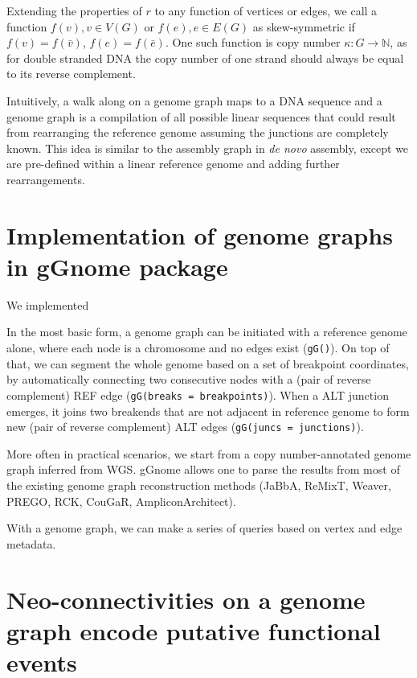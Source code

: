\documentclass[phd,tocprelim]{cornell}
\begin{document}
Extending the properties of $r$ to any function of vertices or edges, we call a function $f(v), v \in V(G)$ or $f(e), e \in E(G)$ as skew-symmetric if $f(v) = f(\bar{v})$, $f(e)=f(\bar{e})$. One such function is copy number $\kappa : G \rightarrow \mathbb{N}$, as for double stranded DNA the copy number of one strand should always be equal to its reverse complement.

Intuitively, a walk along on a genome graph maps to a DNA sequence and a genome graph is a compilation of all possible linear sequences that could result from rearranging the reference genome assuming the junctions are completely known. This idea is similar to the assembly graph in \textit{de novo} assembly, except we are pre-defined within a linear reference genome and adding further rearrangements.

\section{Implementation of genome graphs in gGnome package}
We implemented 

In the most basic form, a genome graph can be initiated with a reference genome alone, where each node is a chromosome and no edges exist (\texttt{gG()}). On top of that, we can segment the whole genome based on a set of breakpoint coordinates, by automatically connecting two consecutive nodes with a (pair of reverse complement) REF edge (\texttt{gG(breaks = breakpoints)}). When a ALT junction emerges, it joins two breakends that are not adjacent in reference genome to form new (pair of reverse complement) ALT edges (\texttt{gG(juncs = junctions)}).

More often in practical scenarios, we start from a copy number-annotated genome graph inferred from WGS. gGnome allows one to parse the results from most of the existing genome graph reconstruction methods (JaBbA, ReMixT, Weaver, PREGO, RCK, CouGaR, AmpliconArchitect). 

With a genome graph, we can make a series of queries based on vertex and edge metadata.

\section{Neo-connectivities on a genome graph encode putative functional events}
\end{document}
